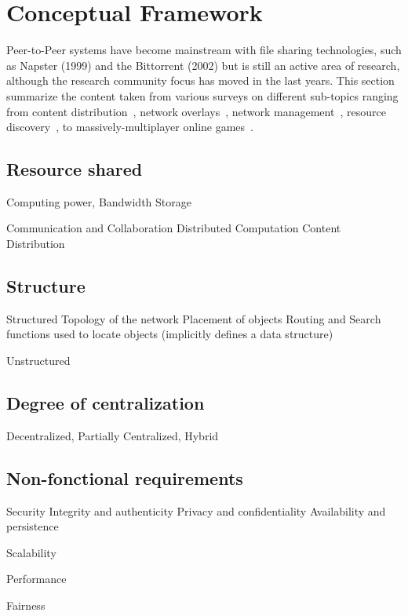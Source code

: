 \section{Conceptual Framework}

Peer-to-Peer systems have become mainstream with file sharing technologies, such as Napster (1999) and the Bittorrent (2002) but is still an active area of research, although the research community focus has moved in the last years. This section summarize the content taken from various surveys on different sub-topics ranging from content distribution~\cite{Androutsellis-Theotokis:2004}, network overlays~\cite{Lua:2005}, network management~\cite{Amad:2012}, resource discovery~\cite{Lazaro:2013}, to massively-multiplayer online games~\cite{Yahyavi:2014}.

\subsection{Resource shared}

Computing power,
Bandwidth
Storage

Communication and Collaboration
Distributed Computation
Content Distribution

\subsection{Structure}

Structured
    Topology of the network
    Placement of objects
    Routing and Search functions used to locate objects 
    (implicitly defines a data structure)
    
Unstructured

\subsection{Degree of centralization}

Decentralized, Partially Centralized, Hybrid

\subsection{Non-fonctional requirements}

Security
    Integrity and authenticity
    Privacy and confidentiality
    Availability and persistence
 
Scalability

Performance

Fairness 

